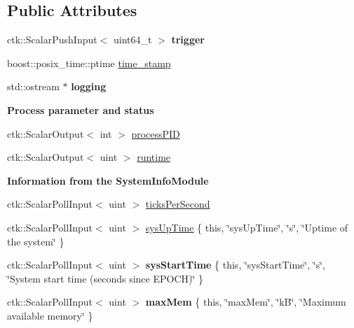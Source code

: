 \subsection*{Public Attributes}
\begin{DoxyCompactItemize}
\item 
ctk\+::\+Scalar\+Push\+Input$<$ uint64\+\_\+t $>$ {\bfseries trigger}
\item 
boost\+::posix\+\_\+time\+::ptime \hyperlink{structProcessInfoModule_af863af6e454aa703037963ad401cae92}{time\+\_\+stamp}
\item 
std\+::ostream $\ast$ {\bfseries logging}\hypertarget{structProcessInfoModule_a868c52f7b5aa78cd208215b381fc12eb}{}\label{structProcessInfoModule_a868c52f7b5aa78cd208215b381fc12eb}

\end{DoxyCompactItemize}
\begin{Indent}{\bf Process parameter and status}\par
\begin{DoxyCompactItemize}
\item 
ctk\+::\+Scalar\+Output$<$ int $>$ \hyperlink{structProcessInfoModule_aae5355d8100a201888fd835a7515f456}{process\+P\+ID}
\item 
ctk\+::\+Scalar\+Output$<$ uint $>$ \hyperlink{structProcessInfoModule_a8c11129c477f0177e253f3ce414d0fc3}{runtime}
\end{DoxyCompactItemize}
\end{Indent}
\begin{Indent}{\bf Information from the System\+Info\+Module}\par
\begin{DoxyCompactItemize}
\item 
ctk\+::\+Scalar\+Poll\+Input$<$ uint $>$ \hyperlink{structProcessInfoModule_a5555ea48a4e228afb662f9523ab6c42d}{ticks\+Per\+Second}
\item 
ctk\+::\+Scalar\+Poll\+Input$<$ uint $>$ \hyperlink{structProcessInfoModule_adbe9f029d44d0ca7d0943e2c9e27614c}{sys\+Up\+Time} \{ this, \char`\"{}sys\+Up\+Time\char`\"{}, \char`\"{}s\char`\"{}, \char`\"{}Uptime of the system\char`\"{} \}
\item 
ctk\+::\+Scalar\+Poll\+Input$<$ uint $>$ {\bfseries sys\+Start\+Time} \{ this, \char`\"{}sys\+Start\+Time\char`\"{}, \char`\"{}s\char`\"{}, \char`\"{}System start time (seconds since E\+P\+O\+CH)\char`\"{} \}\hypertarget{structProcessInfoModule_abe02040aa7d07278c251ed1e1877002b}{}\label{structProcessInfoModule_abe02040aa7d07278c251ed1e1877002b}

\item 
ctk\+::\+Scalar\+Poll\+Input$<$ uint $>$ {\bfseries max\+Mem} \{ this, \char`\"{}max\+Mem\char`\"{}, \char`\"{}kB\char`\"{}, \char`\"{}Maximum available memory\char`\"{} \}\hypertarget{structProcessInfoModule_adc8abddf6db9a457cd953729ee887339}{}\label{structProcessInfoModule_adc8abddf6db9a457cd953729ee887339}

\end{DoxyCompactItemize}
\end{Indent}
